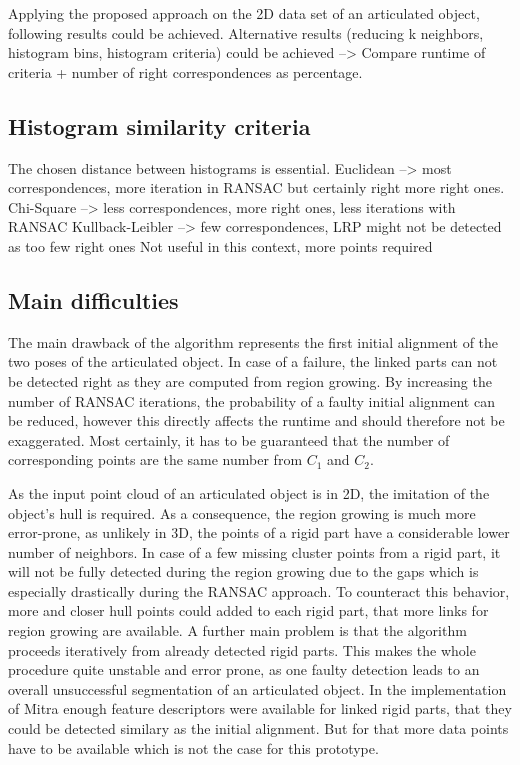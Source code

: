 Applying the proposed approach on the 2D data set of an articulated object, following results could be achieved. Alternative results (reducing k neighbors, histogram bins, histogram criteria) could be achieved --> Compare runtime of criteria + number of right correspondences as percentage.


\subsection{Histogram similarity criteria}
The chosen distance between histograms is essential. Euclidean --> most correspondences, more iteration in RANSAC but certainly right more right ones.
Chi-Square --> less correspondences, more right ones, less iterations with RANSAC
Kullback-Leibler --> few correspondences, LRP might not be detected as too few right ones
Not useful in this context, more points required

\subsection{Main difficulties}
The main drawback of the algorithm represents the first initial alignment of the two poses of the articulated object. In case of a failure, the linked parts can not be detected right as they are computed from region growing. By increasing the number of RANSAC iterations, the probability of a faulty initial alignment can be reduced, however this directly affects the runtime and should therefore not be exaggerated. Most certainly, it has to be guaranteed that the number of corresponding points are the same number from $C_1$ and $C_2$.


As the input point cloud of an articulated object is in 2D, the imitation of the object's hull is required. As a consequence, the region growing is much more error-prone, as unlikely in 3D, the points of a rigid part have a considerable lower number of neighbors. In case of a few missing cluster points from a rigid part, it will not be fully detected during the region growing due to the gaps which is especially drastically during the RANSAC approach. To counteract this behavior, more and closer hull points could added to each rigid part, that more links for region growing are available. A further main problem is that the algorithm proceeds iteratively from already detected rigid parts. This makes the whole procedure quite unstable and error prone, as one faulty detection leads to an overall unsuccessful segmentation of an articulated object. In the implementation of Mitra enough feature descriptors were available for linked rigid parts, that they could be detected similary as the initial alignment. But for that more data points have to be available which is not the case for this prototype.

